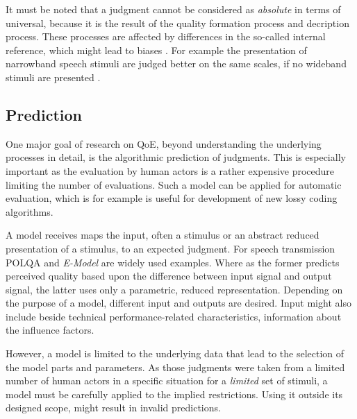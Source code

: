 It must be noted that a judgment cannot be considered as \emph{absolute} in terms of universal, because it is the result of the quality formation process and decription process.
These processes are affected by differences in the so-called internal reference, which might lead to biases \citep[\cf,][]{zielinski_biases_2008, pitrey_aligning_2011}.
For example the presentation of narrowband speech stimuli are judged better on the same scales, if no wideband stimuli are presented \citep[\cf,][]{koster_comparison_2015}.

\subsection{Prediction}
One major goal of research on \ac{QoE}, beyond understanding the underlying processes in detail, is the algorithmic prediction of judgments.
This is especially important as the evaluation by human actors is a rather expensive procedure limiting the number of evaluations.
Such a model can be applied for automatic evaluation, which is for example is useful for  development of new lossy coding algorithms.

A model receives maps the input, often a stimulus or an abstract reduced presentation of a stimulus, to an expected judgment.
For speech transmission \ac{POLQA} \citep{itu-t_p.863:_2014} and \emph{E-Model} \citep{itu-t_g.107:_2014} are widely used examples.
Where as the former predicts perceived quality based upon the difference between input signal and output signal, the latter uses only a parametric, reduced representation.
Depending on the purpose of a model, different input and outputs are desired.
Input might also include beside technical performance-related characteristics, information about the influence factors.

However, a model is limited to the underlying data that lead to the selection of the model parts and parameters.
As those judgments were taken from a limited number of human actors in a specific situation for a \emph{limited} set of stimuli, a model must be carefully applied to the implied restrictions.
Using it outside its designed scope, might result in invalid predictions.